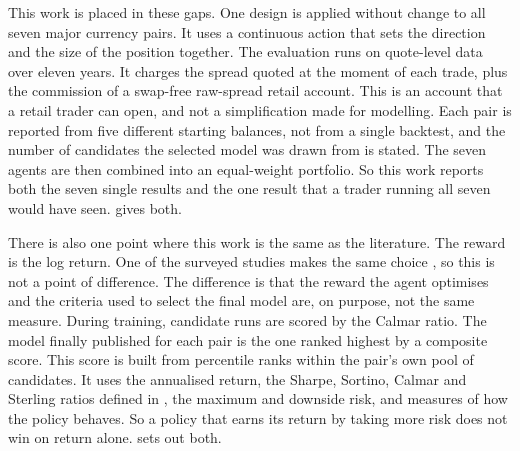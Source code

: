 This work is placed in these gaps. One design is applied without change to all seven major currency pairs. It uses a continuous action that sets the direction and the size of the position together. The evaluation runs on quote-level data over eleven years. It charges the spread quoted at the moment of each trade, plus the commission of a swap-free raw-spread retail account. This is an account that a retail trader can open, and not a simplification made for modelling. Each pair is reported from five different starting balances, not from a single backtest, and the number of candidates the selected model was drawn from is stated. The seven agents are then combined into an equal-weight portfolio. So this work reports both the seven single results and the one result that a trader running all seven would have seen.  gives both.

There is also one point where this work is the same as the literature. The reward is the log return. One of the surveyed studies makes the same choice \cite{majidi_algorithmic_2022}, so this is not a point of difference. The difference is that the reward the agent optimises and the criteria used to select the final model are, on purpose, not the same measure. During training, candidate runs are scored by the Calmar ratio. The model finally published for each pair is the one ranked highest by a composite score. This score is built from percentile ranks within the pair's own pool of candidates. It uses the annualised return, the Sharpe, Sortino, Calmar and Sterling ratios defined in , the maximum and downside risk, and measures of how the policy behaves. So a policy that earns its return by taking more risk does not win on return alone.  sets out both.